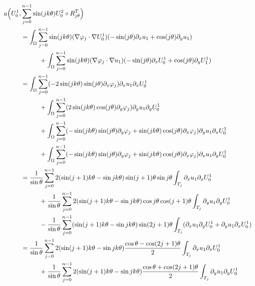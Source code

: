 \vspace*{-1\baselineskip}
\bgroup\smaller
\begin{align*}
a\Bigl(U_0^1,&\sum_{j=0}^{n-1} \sin(jk\theta) U_0^2 \circ R_{j\theta}^T\Bigr)\\
&= \int_\Omega \sum_{j=0}^{n-1} \sin(jk\theta)(\nabla \varphi_j\cdot \nabla U_0^1)(-\sin(j\theta) \partial_x u_1+\cos (j\theta)\partial_y u_1) \\
&\hspace*{1cm}+ \int_\Omega \sum_{j=0}^{n-1}\sin(jk\theta) (\nabla \varphi_j\cdot \nabla u_1)(-\sin(j\theta) \partial_x U_0^1 +\cos(j\theta) \partial_y U_1^1) \\
&= \int_\Omega \sum_{j=0}^{n-1} (-2 \sin(jk\theta)\sin(j\theta)\partial_x \varphi_j) \partial_x u_1 \partial_x U_0^1 \\
&\hspace*{1cm}+ \int_\Omega \sum_{j=0}^{n-1}(2\sin(jk\theta)\cos(j\theta)\partial_y \varphi_j) \partial_y u_1 \partial_y U_0^1 \\
&\hspace*{1cm}+ \int_\Omega \sum_{j=0}^{n-1} (-\sin(jk\theta)\sin(j\theta)\partial_y \varphi_j+\sin(jk\theta)\cos(j\theta)\partial_x \varphi_j) \partial_y u_1 \partial_x U_0^1 \\
&\hspace*{1cm}+ \int_\Omega \sum_{j=0}^{n-1} (-\sin(jk\theta)\sin(j\theta)\partial_y \varphi_j+\sin(jk\theta)\cos(j\theta)\partial_x \varphi_j) \partial_x u_1 \partial_y U_0^1\\
&=\frac{1}{\sin \theta}\sum_{j=0}^{n-1}2 (\sin(j+1)k\theta-\sin jk\theta)\sin(j+1)\theta\sin j\theta \int_{T_j} \partial_x u_1 \partial_x U_0^1\\
&\hspace*{1cm}+\frac{1}{\sin \theta}\sum_{j=0}^{n-1} 2(\sin(j+1)k\theta-\sin jk\theta)\cos j \theta\cos (j+1)\theta \int_{T_j} \partial_y u_1 \partial_y U_0^1\\
&\hspace*{1cm}-\frac{1}{\sin \theta}\sum_{j=0}^{n-1} (\sin(j+1)k\theta-\sin jk\theta)\sin(2j+1)\theta
\int_{T_j} (\partial_x u_1 \partial_y U_0^1 + \partial_y u_1 \partial_x U_0^1)\\
&=\frac{1}{\sin \theta}\sum_{j=0}^{n-1}2 (\sin(j+1)k\theta-\sin jk\theta)\frac{\cos\theta-\cos (2j+1) \theta}{2}
\int_{T_j} \partial_x u_1 \partial_x U_0^1\\
&\hspace*{1cm}+\frac{1}{\sin \theta}\sum_{j=0}^{n-1} 2(\sin(j+1)k\theta-\sin jk\theta)\frac{\cos\theta+\cos (2j+1) \theta}{2} \int_{T_j} \partial_y u_1 \partial_y U_0^1\\

\end{align*}
